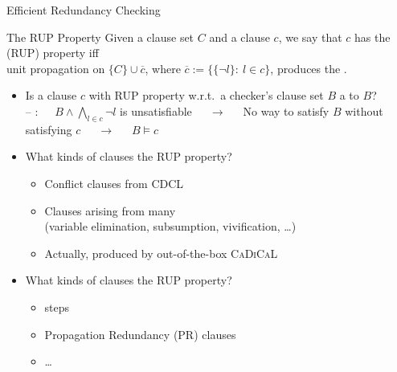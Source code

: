 \documentclass[t,english]{sdqbeamer}
\begin{document}
\begin{frame}{Efficient Redundancy Checking~\cite{van2008verifying}}
	
	\vspace*{-2mm}
	\begin{blueblock}{The RUP Property}
		Given a clause set $C$ and a clause $c$, we say that $c$ has the  (RUP) property iff\\
		unit propagation on $\{ C \} \cup \overline{c}$, where $\overline{c} := \{ \{ \neg l \} :\ l \in c \}$, produces the .
	\end{blueblock}
	\begin{itemize}\setlength{\itemsep}{3mm}
		\item Is a clause $c$ with RUP property w.r.t.\ a checker's clause set $B$ a  to $B$?\\
		\pause
		-- :\ \ \ $B \wedge \bigwedge_{l \in c} \neg l$ is unsatisfiable\ \ \ $\rightarrow$\ \ \ No way to satisfy $B$ without satisfying $c$\ \ \ $\rightarrow$\ \ \ $B \models c$
		\pause
		\item What kinds of clauses  the RUP property?
		\begin{itemize}
			\item Conflict clauses from CDCL
			\item Clauses arising from many \\
			(variable elimination, subsumption, vivification, \ldots)
			\item Actually,  produced by out-of-the-box \textsc{CaDiCaL}
		\end{itemize}
		\pause
		\item What kinds of clauses  the RUP property?
		\begin{itemize}
			\item {} steps
			\item Propagation Redundancy (PR) clauses
			\item \ldots
		\end{itemize}
	\end{itemize}
\end{frame}

\newcommand{\beginalgo}{\hrule\vspace*{2mm}}
\newcommand{\finishalgo}{\vspace*{2mm}\hrule}
\end{document}
